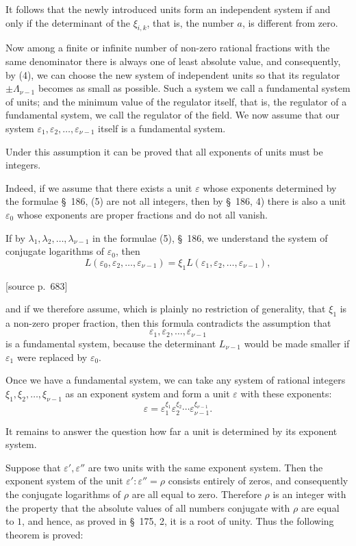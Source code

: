\documentclass[11pt]{article}
\newcommand{\srcpage}[1]{\par\medskip\noindent\textsf{[source p.~#1]}\par\smallskip}
\begin{document}
It follows that the newly introduced units form an independent system if and only if the determinant of the $\xi_{i,k}$, that is, the number $a$, is different from zero.

Now among a finite or infinite number of non-zero rational fractions with the same denominator there is always one of least absolute value, and consequently, by (4), we can choose the new system of independent units so that its regulator $\pm\Lambda_{\nu-1}$ becomes as small as possible. Such a system we call a fundamental system of units; and the minimum value of the regulator itself, that is, the regulator of a fundamental system, we call the regulator of the field. We now assume that our system $\varepsilon_1,\varepsilon_2,\ldots,\varepsilon_{\nu-1}$ itself is a fundamental system.

Under this assumption it can be proved that all exponents of units must be integers.

Indeed, if we assume that there exists a unit $\varepsilon$ whose exponents determined by the formulae \S~186, (5) are not all integers, then by \S~186, 4) there is also a unit $\varepsilon_0$ whose exponents are proper fractions and do not all vanish.

If by $\lambda_1,\lambda_2,\ldots,\lambda_{\nu-1}$ in the formulae (5), \S~186, we understand the system of conjugate logarithms of $\varepsilon_0$, then
\[
L(\varepsilon_0,\varepsilon_2,\ldots,\varepsilon_{\nu-1})=\xi_1L(\varepsilon_1,\varepsilon_2,\ldots,\varepsilon_{\nu-1}),
\]
\srcpage{683}
and if we therefore assume, which is plainly no restriction of generality, that $\xi_1$ is a non-zero proper fraction, then this formula contradicts the assumption that
\[
\varepsilon_1,\varepsilon_2,\ldots,\varepsilon_{\nu-1}
\]
is a fundamental system, because the determinant $L_{\nu-1}$ would be made smaller if $\varepsilon_1$ were replaced by $\varepsilon_0$.

Once we have a fundamental system, we can take any system of rational integers $\xi_1,\xi_2,\ldots,\xi_{\nu-1}$ as an exponent system and form a unit $\varepsilon$ with these exponents:
\[
\varepsilon=\varepsilon_1^{\xi_1}\varepsilon_2^{\xi_2}\cdots\varepsilon_{\nu-1}^{\xi_{\nu-1}}.
\]

It remains to answer the question how far a unit is determined by its exponent system.

Suppose that $\varepsilon',\varepsilon''$ are two units with the same exponent system. Then the exponent system of the unit $\varepsilon':\varepsilon''=\rho$ consists entirely of zeros, and consequently the conjugate logarithms of $\rho$ are all equal to zero. Therefore $\rho$ is an integer with the property that the absolute values of all numbers conjugate with $\rho$ are equal to $1$, and hence, as proved in \S~175, 2, it is a root of unity. Thus the following theorem is proved:
\end{document}
